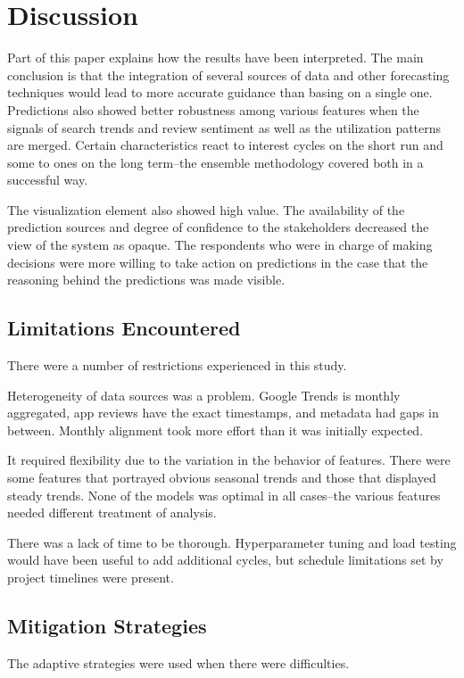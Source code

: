
\section{Discussion}

Part of this paper explains how the results have been interpreted.
The main conclusion is that the integration of several sources of data and other forecasting techniques would lead to more accurate guidance than basing on a single one. Predictions also showed better robustness among various features when the signals of search trends and review sentiment as well as the utilization patterns are merged. Certain characteristics react to interest cycles on the short run and some to ones on the long term--the ensemble methodology covered both in a successful way.

The visualization element also showed high value. The availability of the prediction sources and degree of confidence to the stakeholders decreased the view of the system as opaque. The respondents who were in charge of making decisions were more willing to take action on predictions in the case that the reasoning behind the predictions was made visible.

\subsection{Limitations Encountered}
There were a number of restrictions experienced in this study.

Heterogeneity of data sources was a problem. Google Trends is monthly aggregated, app reviews have the exact timestamps, and metadata had gaps in between. Monthly alignment took more effort than it was initially expected.

It required flexibility due to the variation in the behavior of features. There were some features that portrayed obvious seasonal trends and those that displayed steady trends. None of the models was optimal in all cases--the various features needed different treatment of analysis.

There was a lack of time to be thorough. Hyperparameter tuning and load testing would have been useful to add additional cycles, but schedule limitations set by project timelines were present.

\subsection{Mitigation Strategies}
The adaptive strategies were used when there were difficulties.


